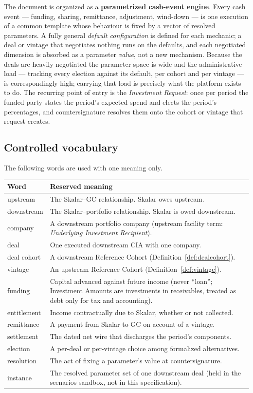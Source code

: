 \documentclass[11pt, a4paper]{article}
\theoremstyle{definition}
\newcommand{\GCCIA}{upstream facility}
\begin{document}
The document is organized as a \textbf{parametrized cash-event engine}. Every cash event --- funding, sharing, remittance, adjustment, wind-down --- is one execution of a common template whose behaviour is fixed by a vector of resolved parameters. A fully general \emph{default configuration} is defined for each mechanic; a deal or vintage that negotiates nothing runs on the defaults, and each negotiated dimension is absorbed as a parameter \emph{value}, not a new mechanism. Because the deals are heavily negotiated the parameter space is wide and the administrative load --- tracking every election against its default, per cohort and per vintage --- is correspondingly high; carrying that load is precisely what the platform exists to do. The recurring point of entry is the \emph{Investment Request}: once per period the funded party states the period's expected spend and elects the period's percentages, and countersignature resolves them onto the cohort or vintage that request creates.

\subsection{Controlled vocabulary}

The following words are used with one meaning only.

\begin{longtable}{@{} L{3.2cm} L{11.6cm} @{}}
\toprule
\textbf{Word} & \textbf{Reserved meaning} \\
\midrule
\endhead
upstream & The Skalar--GC relationship. Skalar owes upstream. \\[3pt]
downstream & The Skalar--portfolio relationship. Skalar is owed downstream. \\[3pt]
company & A downstream portfolio company (\GCCIA{} term: \emph{Underlying Investment Recipient}). \\[3pt]
deal & One executed downstream CIA with one company. \\[3pt]
deal cohort & A downstream Reference Cohort (Definition~\ref{def:dealcohort}). \\[3pt]
vintage & An upstream Reference Cohort (Definition~\ref{def:vintage}). \\[3pt]
funding & Capital advanced against future income (never ``loan''; Investment Amounts are investments in receivables, treated as debt only for tax and accounting). \\[3pt]
entitlement & Income contractually due to Skalar, whether or not collected. \\[3pt]
remittance & A payment from Skalar to GC on account of a vintage. \\[3pt]
settlement & The dated net wire that discharges the period's components. \\[3pt]
election & A per-deal or per-vintage choice among formalized alternatives. \\[3pt]
resolution & The act of fixing a parameter's value at countersignature. \\[3pt]
instance & The resolved parameter set of one downstream deal (held in the scenarios sandbox, not in this specification). \\
\bottomrule
\end{longtable}
\end{document}
